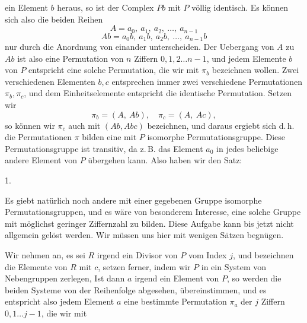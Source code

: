 ein Element $b$ heraus, so ist der Complex $Pb$ mit $P$ völlig
identisch. Es können sich also die beiden Reihen
\[
A = a_0,\ a_1,\ a_2,\ \ldots,\ a_{n-1}
\]
\[
Ab = a_0b,\ a_1b,\ a_2b,\ \ldots,\ a_{n-1}b
\]
nur durch die Anordnung von einander unterscheiden. Der
Uebergang von $A$ zu $Ab$ ist also eine Permutation von $n$ Ziffern
$0, 1, 2 \ldots n - 1$, und jedem Elemente $b$ von $P$ entspricht eine
solche Permutation, die wir mit $\pi_b$ bezeichnen wollen. Zwei verschiedenen
Elementen $b, c$ entsprechen immer zwei verschiedene
Permutationen $\pi_b, \pi_c$, und dem Einheitselemente entspricht die
identische Permutation. Setzen wir
\[
\pi_b = (A,\ Ab), \quad \pi_c = (A,\ Ac),
\]
so können wir $\pi_c$ auch mit $(Ab, Abc)$ bezeichnen, und daraus
ergiebt sich
d.\,h. die Permutationen $\pi$ bilden eine mit $P$ isomorphe Permutationsgruppe. Diese Permutationsgruppe ist transitiv, da z.\,B.
das Element $a_0$ in jedes beliebige andere Element von $P$ übergehen kann. Also haben wir den Satz:

1.\ 

Es giebt natürlich noch andere mit einer gegebenen Gruppe
isomorphe Permutationsgruppen, und es wäre von besonderem
Interesse, eine solche Gruppe mit möglichst geringer Ziffernzahl
zu bilden. Diese Aufgabe kann bis jetzt nicht allgemein gelöst
werden. Wir müssen uns hier mit wenigen Sätzen begnügen.

Wir nehmen an, es sei $R$ irgend ein Divisor von $P$ vom
Index $j$, und bezeichnen die Elemente von $R$ mit $c$, setzen ferner,
indem wir $P$ in ein System von Nebengruppen zerlegen,
Ist dann $a$ irgend ein Element von $P$, so werden die beiden
Systeme
von der Reihenfolge abgesehen, übereinstimmen, und es entspricht also jedem Element $a$ eine bestimmte Permutation $\pi_a$ der
$j$ Ziffern $0, 1 \ldots j - 1$, die wir mit
